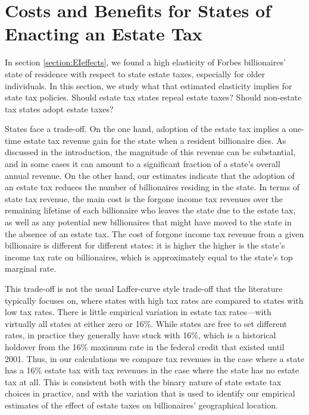 \documentclass[12pt]{article}
\begin{document}
\section{Costs and Benefits for States of Enacting an Estate Tax}
\label{section:CB}

In section \ref{section:EIeffects}, we found a high elasticity of Forbes billionaires' state of residence with respect to state estate taxes, especially for older individuals. In this section, we study what that estimated elasticity implies for state tax policies. Should estate tax states repeal estate taxes? Should non-estate tax states adopt estate taxes? 

States face a trade-off. On the one hand, adoption of the estate tax implies a one-time estate tax revenue gain for the state when a resident billionaire dies. As discussed in the introduction, the magnitude of this revenue can be substantial, and in some cases it can amount to a significant fraction of a state's overall annual revenue. On the other hand, our estimates indicate that the adoption of an estate tax reduces the number of billionaires residing in the state. In terms of state tax revenue, the main cost is the forgone income tax revenues over the remaining lifetime of each billionaire who leaves the state due to the estate tax, as well as any potential new billionaires that might have moved to the state in the absence of an estate tax. The cost of forgone income tax revenue from a given billionaire is different for different states: it is higher the higher is the state's income tax rate on billionaires, which is approximately equal to the state's top marginal rate.

This trade-off is not the usual Laffer-curve style trade-off that the literature  typically focuses on, where states with high tax rates are compared to states with low tax rates. There is little empirical variation in estate tax rates---with virtually all states at either zero or 16\%. While states are free to set different rates, in practice they generally have stuck with 16\%, which is a historical holdover from the 16\% maximum rate in the federal credit that existed until 2001. Thus, in our calculations we compare tax revenues in the case where a state has a 16\% estate tax with tax revenues in the case where the state has no estate tax at all. This is consistent both with the binary nature of state estate tax choices in practice, and with the variation that is used to identify our empirical estimates of the effect of estate taxes on billionaires' geographical location.  
\end{document}
